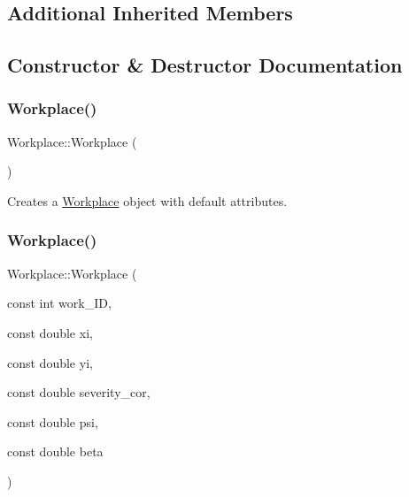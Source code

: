 \subsection*{Additional Inherited Members}


\subsection{Constructor \& Destructor Documentation}
\mbox{\label{classWorkplace_af182fb46622e45e1c45cec7ab5c3a3c1}} 
\subsubsection{\texorpdfstring{Workplace()}{Workplace()}\hspace{0.1cm}{\footnotesize\ttfamily [1/2]}}
{\footnotesize\ttfamily Workplace\+::\+Workplace (\begin{DoxyParamCaption}{ }\end{DoxyParamCaption})\hspace{0.3cm}{\ttfamily [default]}}



Creates a \hyperlink{classWorkplace}{Workplace} object with default attributes. 

\mbox{\label{classWorkplace_a0d116e1103d53e5417c295eebcfc7f39}} 
\subsubsection{\texorpdfstring{Workplace()}{Workplace()}\hspace{0.1cm}{\footnotesize\ttfamily [2/2]}}
{\footnotesize\ttfamily Workplace\+::\+Workplace (\begin{DoxyParamCaption}\item[{const int}]{work\+\_\+\+ID,  }\item[{const double}]{xi,  }\item[{const double}]{yi,  }\item[{const double}]{severity\+\_\+cor,  }\item[{const double}]{psi,  }\item[{const double}]{beta }\end{DoxyParamCaption})\hspace{0.3cm}{\ttfamily [inline]}}



